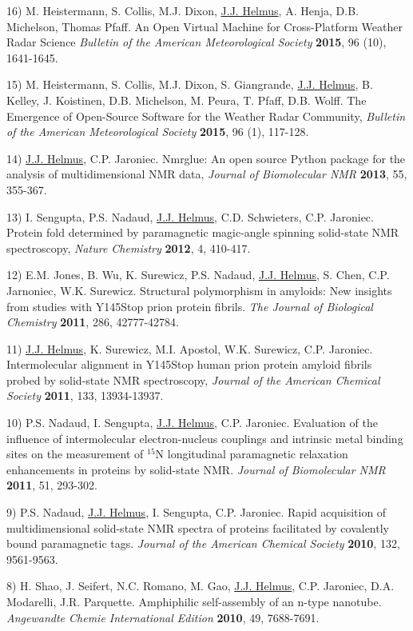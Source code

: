 \documentclass[margin,line]{res}
\begin{document}
\begin{resume}
16) M. Heistermann, S. Collis, M.J. Dixon,
\underline{J.J. Helmus}, A. Henja, D.B. Michelson, Thomas Pfaff.
An Open Virtual Machine for Cross-Platform Weather Radar Science
{\em Bulletin of the American Meteorological Society} {\bf 2015},
96 (10), 1641-1645.

15) M. Heistermann, S. Collis, M.J. Dixon, S. Giangrande,
\underline{J.J.  Helmus}, B. Kelley, J. Koistinen, D.B. Michelson, M. Peura,
T. Pfaff, D.B. Wolff.
The Emergence of Open-Source Software for the Weather Radar Community,
{\em Bulletin of the American Meteorological Society} {\bf 2015}, 96 (1), 117-128.

14) \underline{J.J. Helmus}, C.P. Jaroniec.
Nmrglue: An open source Python package for the analysis of multidimensional NMR data,
{\em Journal of Biomolecular NMR} {\bf 2013}, 55, 355-367.

13) I. Sengupta, P.S. Nadaud, \underline{J.J. Helmus}, C.D. Schwieters, C.P. Jaroniec.
Protein fold determined by paramagnetic magic-angle spinning solid-state NMR spectroscopy,
{\em Nature Chemistry} {\bf 2012}, 4, 410-417.

12) E.M. Jones, B. Wu, K. Surewicz, P.S. Nadaud, \underline{J.J. Helmus}, S. Chen,
C.P. Jarnoniec, W.K. Surewicz.
Structural polymorphism in amyloids: New insights from studies with Y145Stop prion protein fibrils.
{\em The Journal of Biological Chemistry} {\bf 2011}, 286, 42777-42784.

11) \underline{J.J. Helmus}, K. Surewicz, M.I. Apostol, W.K. Surewicz, C.P. Jaroniec.
Intermolecular alignment in Y145Stop human prion protein amyloid fibrils probed by solid-state
NMR spectroscopy,
{\em Journal of the American Chemical Society} {\bf 2011}, 133, 13934-13937.

10) P.S. Nadaud, I. Sengupta, \underline{J.J. Helmus}, C.P. Jaroniec.
Evaluation of the influence of intermolecular electron-nucleus couplings and intrinsic metal
binding sites on the measurement of $^{15}$N longitudinal paramagnetic relaxation enhancements
in proteins by solid-state NMR.
{\em Journal of Biomolecular NMR} {\bf 2011}, 51, 293-302.

9) P.S. Nadaud, \underline{J.J. Helmus}, I. Sengupta, C.P. Jaroniec.
Rapid acquisition of multidimensional solid-state NMR spectra of proteins facilitated by
covalently bound paramagnetic tags.
{\em Journal of the American Chemical Society} {\bf 2010}, 132, 9561-9563.

8) H. Shao, J. Seifert, N.C. Romano, M. Gao, \underline{J.J. Helmus}, C.P. Jaroniec,
D.A. Modarelli, J.R. Parquette.
Amphiphilic self-assembly of an n-type nanotube.
{\em Angewandte Chemie International Edition} {\bf 2010}, 49, 7688-7691.


\end{resume}
\end{document}

